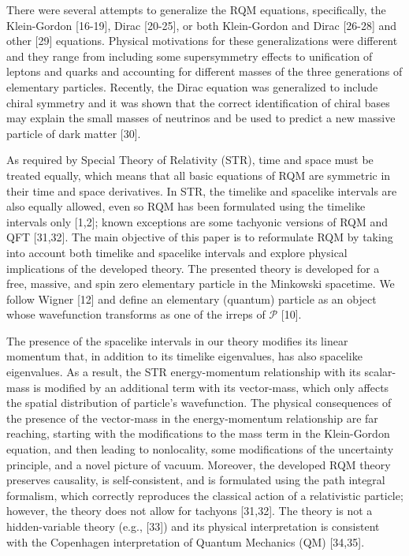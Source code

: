 \documentclass[12pt]{iopart}
\begin{document}
There were several attempts to generalize the RQM equations, specifically, the Klein-Gordon 
[16-19], Dirac [20-25], or both Klein-Gordon and Dirac [26-28] and other [29] equations. 
Physical motivations for these generalizations were different and they range from including 
some supersymmetry effects to unification of leptons and quarks and accounting for different 
masses of the three generations of elementary particles.  Recently, the Dirac equation was 
generalized to include chiral symmetry and it was shown that the correct identification 
of chiral bases may explain the small masses of neutrinos and be used to predict a new 
massive particle of dark matter [30].  

As required by Special Theory of Relativity (STR), time and space must be treated
equally, which means that all basic equations of RQM are symmetric in their time
and space derivatives.  In STR, the timelike and spacelike intervals are also equally
allowed, even so RQM has been formulated using the timelike intervals only [1,2]; 
known exceptions are some tachyonic versions of RQM and QFT [31,32].  The main 
objective of this paper is to reformulate RQM by taking into account both timelike 
and spacelike intervals and explore physical implications of the developed theory. 
The presented theory is developed for a free, massive, and spin zero elementary 
particle in the Minkowski spacetime.  We follow Wigner [12] and define an 
elementary (quantum) particle as an object whose wavefunction transforms as 
one of the irreps of $\mathcal {P}$ [10]. 

The presence of the spacelike intervals in our theory modifies its linear momentum
that, in addition to its timelike eigenvalues, has also spacelike eigenvalues.  As a 
result, the STR energy-momentum relationship with its scalar-mass is modified by 
an additional term with its vector-mass, which only affects the spatial distribution
of particle's wavefunction.  The physical consequences of the presence of the 
vector-mass in the energy-momentum relationship are far reaching, starting with
the modifications to the mass term in the Klein-Gordon equation, and then leading
to nonlocality, some modifications of the uncertainty principle, and a novel picture
of vacuum.  Moreover, the developed RQM theory preserves causality, is self-consistent, 
and is formulated using the path integral formalism, which correctly reproduces the 
classical action of a relativistic particle; however, the theory does not allow for 
tachyons [31,32].  The theory is not a hidden-variable theory (e.g., [33]) and its 
physical interpretation is consistent with the Copenhagen interpretation of Quantum 
Mechanics (QM) [34,35].  
\end{document}

